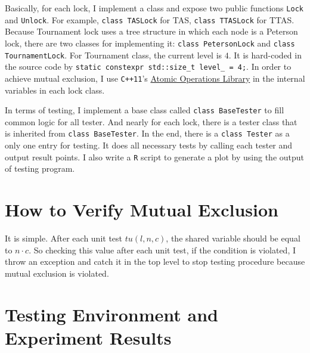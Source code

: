 \documentclass[a4paper]{report}
\begin{document}
Basically, for each lock, I implement a class and expose two public functions \lstinline{Lock} and \lstinline{Unlock}.
For example, \lstinline{class TASLock} for TAS, \lstinline{class TTASLock} for TTAS.
Because Tournament lock uses a tree structure in which each node is a Peterson lock, there are two classes for implementing it: \lstinline{class PetersonLock} and \lstinline{class TournamentLock}.
For Tournament class, the current level is $4$.
It is hard-coded in the source code by \lstinline{static constexpr std::size_t level_ = 4;}.
In order to achieve mutual exclusion, I use \lstinline{C++11}'s \href{http://en.cppreference.com/w/cpp/atomic}{Atomic Operations Library} in the internal variables in each lock class.

In terms of testing, I implement a base class called \lstinline{class BaseTester} to fill common logic for all tester.
And nearly for each lock, there is a tester class that is inherited from \lstinline{class BaseTester}.
In the end, there is a \lstinline{class Tester} as a only one entry for testing.
It does all necessary tests by calling each tester and output result points.
I also write a \lstinline{R} script to generate a plot by using the output of testing program.

\section*{How to Verify Mutual Exclusion}
It is simple.
After each unit test $tu(l, n, c)$, the shared variable should be equal to $n \cdot c$.
So checking this value after each unit test, if the condition is violated, I throw an exception and catch it in the top level to stop testing procedure because mutual exclusion is violated.

\section*{Testing Environment and Experiment Results}
\end{document}
